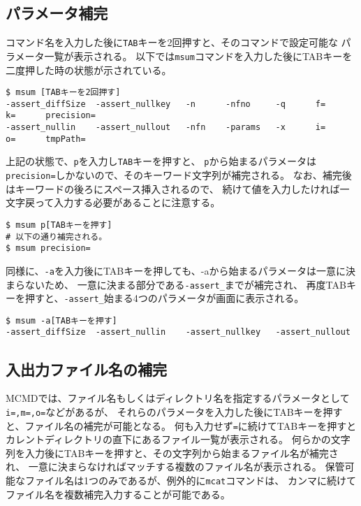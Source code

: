 \subsection{パラメータ補完\label{sect:bash_comp_param}}
コマンド名を入力した後に\verb|TAB|キーを2回押すと、そのコマンドで設定可能な
パラメータ一覧が表示される。
以下では\verb|msum|コマンドを入力した後にTABキーを二度押した時の状態が示されている。

\begin{Verbatim}[baselinestretch=0.7,frame=single]
$ msum [TABキーを2回押す]
-assert_diffSize  -assert_nullkey   -n      -nfno     -q      f=      k=      precision=
-assert_nullin    -assert_nullout   -nfn    -params   -x      i=      o=      tmpPath=
\end{Verbatim}

上記の状態で、\verb|p|を入力し\verb|TAB|キーを押すと、
\verb|p|から始まるパラメータは\verb|precision=|しかないので、そのキーワード文字列が補完される。
なお、補完後はキーワードの後ろにスペース挿入されるので、
続けて値を入力したければ一文字戻って入力する必要があることに注意する。

\begin{Verbatim}[baselinestretch=0.7,frame=single]
$ msum p[TABキーを押す]
# 以下の通り補完される。
$ msum precision= 
\end{Verbatim}

同様に、\verb|-a|を入力後にTABキーを押しても、-aから始まるパラメータは一意に決まらないため、
一意に決まる部分である\verb|-assert_|までが補完され、
再度TABキーを押すと、\verb|-assert_|始まる4つのパラメータが画面に表示される。
\begin{Verbatim}[baselinestretch=0.7,frame=single]
$ msum -a[TABキーを押す]
-assert_diffSize  -assert_nullin    -assert_nullkey   -assert_nullout   
\end{Verbatim}

\subsection{入出力ファイル名の補完\label{sect:bash_comp_file}}
MCMDでは、ファイル名もしくはディレクトリ名を指定するパラメータとして\verb|i=,m=,o=|などがあるが、
それらのパラメータを入力した後にTABキーを押すと、ファイル名の補完が可能となる。
何も入力せず\verb|=|に続けてTABキーを押すとカレントディレクトリの直下にあるファイル一覧が表示される。
何らかの文字列を入力後にTABキーを押すと、その文字列から始まるファイル名が補完され、
一意に決まらなければマッチする複数のファイル名が表示される。
保管可能なファイル名は1つのみであるが、例外的に\verb|mcat|コマンドは、
カンマに続けてファイル名を複数補完入力することが可能である。

